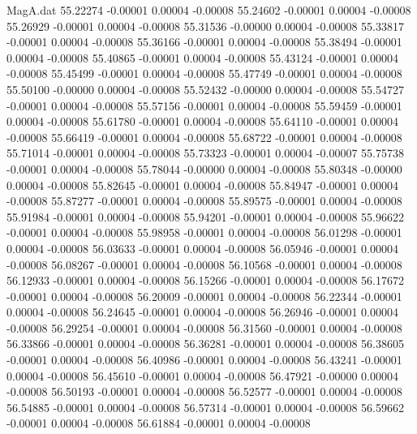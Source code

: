 \begin{filecontents}{MagA.dat}
  55.22274   -0.00001    0.00004   -0.00008
  55.24602   -0.00001    0.00004   -0.00008
  55.26929   -0.00001    0.00004   -0.00008
  55.31536   -0.00000    0.00004   -0.00008
  55.33817   -0.00001    0.00004   -0.00008
  55.36166   -0.00001    0.00004   -0.00008
  55.38494   -0.00001    0.00004   -0.00008
  55.40865   -0.00001    0.00004   -0.00008
  55.43124   -0.00001    0.00004   -0.00008
  55.45499   -0.00001    0.00004   -0.00008
  55.47749   -0.00001    0.00004   -0.00008
  55.50100   -0.00000    0.00004   -0.00008
  55.52432   -0.00000    0.00004   -0.00008
  55.54727   -0.00001    0.00004   -0.00008
  55.57156   -0.00001    0.00004   -0.00008
  55.59459   -0.00001    0.00004   -0.00008
  55.61780   -0.00001    0.00004   -0.00008
  55.64110   -0.00001    0.00004   -0.00008
  55.66419   -0.00001    0.00004   -0.00008
  55.68722   -0.00001    0.00004   -0.00008
  55.71014   -0.00001    0.00004   -0.00008
  55.73323   -0.00001    0.00004   -0.00007
  55.75738   -0.00001    0.00004   -0.00008
  55.78044   -0.00000    0.00004   -0.00008
  55.80348   -0.00000    0.00004   -0.00008
  55.82645   -0.00001    0.00004   -0.00008
  55.84947   -0.00001    0.00004   -0.00008
  55.87277   -0.00001    0.00004   -0.00008
  55.89575   -0.00001    0.00004   -0.00008
  55.91984   -0.00001    0.00004   -0.00008
  55.94201   -0.00001    0.00004   -0.00008
  55.96622   -0.00001    0.00004   -0.00008
  55.98958   -0.00001    0.00004   -0.00008
  56.01298   -0.00001    0.00004   -0.00008
  56.03633   -0.00001    0.00004   -0.00008
  56.05946   -0.00001    0.00004   -0.00008
  56.08267   -0.00001    0.00004   -0.00008
  56.10568   -0.00001    0.00004   -0.00008
  56.12933   -0.00001    0.00004   -0.00008
  56.15266   -0.00001    0.00004   -0.00008
  56.17672   -0.00001    0.00004   -0.00008
  56.20009   -0.00001    0.00004   -0.00008
  56.22344   -0.00001    0.00004   -0.00008
  56.24645   -0.00001    0.00004   -0.00008
  56.26946   -0.00001    0.00004   -0.00008
  56.29254   -0.00001    0.00004   -0.00008
  56.31560   -0.00001    0.00004   -0.00008
  56.33866   -0.00001    0.00004   -0.00008
  56.36281   -0.00001    0.00004   -0.00008
  56.38605   -0.00001    0.00004   -0.00008
  56.40986   -0.00001    0.00004   -0.00008
  56.43241   -0.00001    0.00004   -0.00008
  56.45610   -0.00001    0.00004   -0.00008
  56.47921   -0.00000    0.00004   -0.00008
  56.50193   -0.00001    0.00004   -0.00008
  56.52577   -0.00001    0.00004   -0.00008
  56.54885   -0.00001    0.00004   -0.00008
  56.57314   -0.00001    0.00004   -0.00008
  56.59662   -0.00001    0.00004   -0.00008
  56.61884   -0.00001    0.00004   -0.00008

\end{filecontents}
